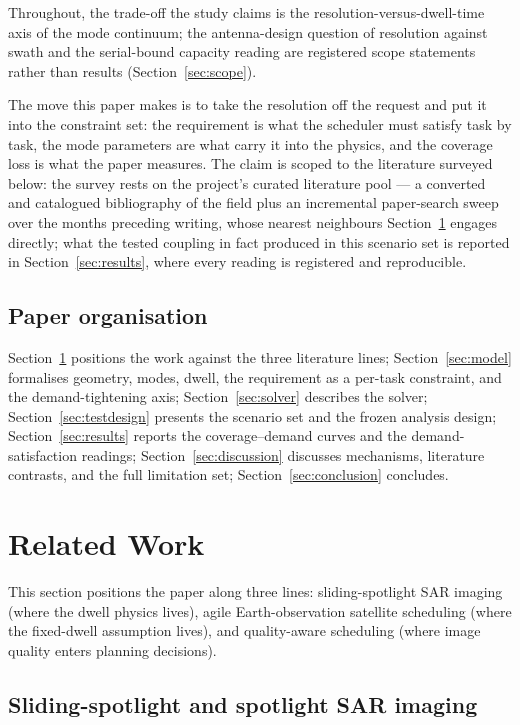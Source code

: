 \documentclass[preprint,authoryear]{elsarticle}
\begin{document}
Throughout, the trade-off the study claims is the resolution-versus-dwell-time axis of the mode continuum; the antenna-design question of resolution against swath and the serial-bound capacity reading are registered scope statements rather than results (Section~\ref{sec:scope}).

The move this paper makes is to take the resolution off the request and put it into the constraint set: the requirement is what the scheduler must satisfy task by task, the mode parameters are what carry it into the physics, and the coverage loss is what the paper measures. The claim is scoped to the literature surveyed below: the survey rests on the project's curated literature pool --- a converted and catalogued bibliography of the field plus an incremental paper-search sweep over the months preceding writing, whose nearest neighbours Section~\ref{sec:related} engages directly; what the tested coupling in fact produced in this scenario set is reported in Section~\ref{sec:results}, where every reading is registered and reproducible.

\subsection{Paper organisation}

Section~\ref{sec:related} positions the work against the three literature lines; Section~\ref{sec:model} formalises geometry, modes, dwell, the requirement as a per-task constraint, and the demand-tightening axis; Section~\ref{sec:solver} describes the solver; Section~\ref{sec:testdesign} presents the scenario set and the frozen analysis design; Section~\ref{sec:results} reports the coverage--demand curves and the demand-satisfaction readings; Section~\ref{sec:discussion} discusses mechanisms, literature contrasts, and the full limitation set; Section~\ref{sec:conclusion} concludes.

\section{Related Work}\label{sec:related}

This section positions the paper along three lines: sliding-spotlight SAR imaging (where the dwell physics lives), agile Earth-observation satellite scheduling (where the fixed-dwell assumption lives), and quality-aware scheduling (where image quality enters planning decisions).

\subsection{Sliding-spotlight and spotlight SAR imaging}
\end{document}
